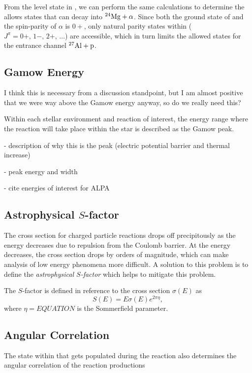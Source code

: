 From the level state in , we can perform the same calculations to
determine the allows states that can decay into ${}^{24}\textrm{Mg} + \alpha$. Since
both the ground state of  and the spin-parity of $\alpha$ is $0+$,
only natural parity states within 
($J^{\pi} = 0+,\, 1-,\, 2+,\, \ldots$) are accessible, which in turn limits the
allowed states for the entrance channel ${}^{27}\textrm{Al} + \rm{p}$.

\subsection{Gamow Energy}

I think this is necessary from a discussion standpoint, but I am almost
positive that we were way above the Gamow energy anyway, so do we really need
this?

Within each stellar environment and reaction of interest, the energy range
where the reaction will take place within the star is described as the Gamow
peak.

- description of why this is the peak (electric potential barrier and thermal increase)

- peak energy and width

- cite energies of interest for ALPA

\subsection{Astrophysical $S$-factor}

The cross section for charged particle reactions drops off precipitously as
the energy decreases due to repulsion from the Coulomb barrier. At the energy
decreases, the cross section drops by orders of magnitude, which can make
analysis of low energy phenomena more difficult. A solution to this problem is
to define the \emph{astrophysical $S$-factor} which helps to mitigate this
problem.

The $S$-factor is defined in reference to the cross section $\sigma(E)$ as
\[
    S(E) = E\sigma(E)e^{2\pi\eta},
\]
where $\eta = EQUATION$ is the Sommerfield parameter.


\subsection{Angular Correlation}
The state within  that gets populated during the reaction also
determines the angular correlation of the reaction productions

